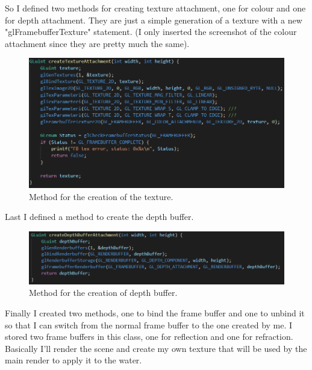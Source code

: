 \noindent
So I defined two methods for creating texture attachment, one for colour and one for depth attachment. They are just a simple generation of a texture with a new "glFramebufferTexture" statement. (I only inserted the screenshot of the colour attachment since they are pretty much the same).

\begin{figure}[hbt!]
	\centering
	\includegraphics[width= 0.9
	\textwidth]{images/FBO2.png}
	\caption{Method for the creation of the texture.}
\end{figure} 

Last I defined a method to create the depth buffer. 

\begin{figure}[hbt!]
	\centering
	\includegraphics[width= 1
	\textwidth]{images/FBO4.png}
	\caption{Method for the creation of depth buffer.}
\end{figure} 

\noindent
Finally I created two methods, one to bind the frame buffer and one to unbind it so that I can switch from the normal frame buffer to the one created by me. I stored two frame buffers in this class, one for reflection and one for refraction. Basically I'll render the scene and create my own texture that will be used by the main render to apply it to the water.

